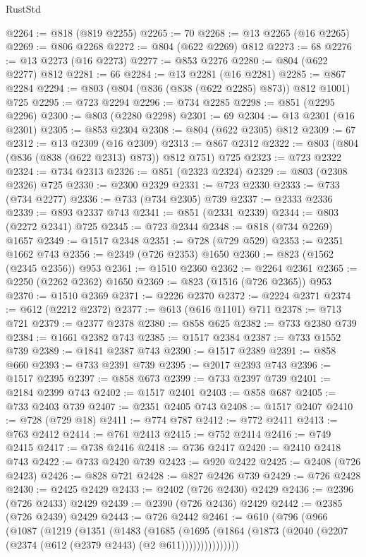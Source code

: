 \begin{lexlean}{RustStd}
\begin{coremodule}
@2264 := @818 (@819 @2255)
@2265 := 70
@2268 := @13 @2265 (@16 @2265)
@2269 := @806 @2268
@2272 := @804 (@622 @2269) @812
@2273 := 68
@2276 := @13 @2273 (@16 @2273)
@2277 := @853 @2276
@2280 := @804 (@622 @2277) @812
@2281 := 66
@2284 := @13 @2281 (@16 @2281)
@2285 := @867 @2284
@2294 := @803 (@804 (@836 (@838 (@622 @2285) @873)) @812 @1001) @725
@2295 := @723 @2294
@2296 := @734 @2285
@2298 := @851 (@2295 @2296)
@2300 := @803 (@2280 @2298)
@2301 := 69
@2304 := @13 @2301 (@16 @2301)
@2305 := @853 @2304
@2308 := @804 (@622 @2305) @812
@2309 := 67
@2312 := @13 @2309 (@16 @2309)
@2313 := @867 @2312
@2322 := @803 (@804 (@836 (@838 (@622 @2313) @873)) @812 @751) @725
@2323 := @723 @2322
@2324 := @734 @2313
@2326 := @851 (@2323 @2324)
@2329 := @803 (@2308 @2326) @725
@2330 := @2300 @2329
@2331 := @723 @2330
@2333 := @733 (@734 @2277)
@2336 := @733 (@734 @2305) @739
@2337 := @2333 @2336
@2339 := @893 @2337 @743
@2341 := @851 (@2331 @2339)
@2344 := @803 (@2272 @2341) @725
@2345 := @723 @2344
@2348 := @818 (@734 @2269) @1657
@2349 := @1517 @2348
@2351 := @728 (@729 @529)
@2353 := @2351 @1662 @743
@2356 := @2349 (@726 @2353) @1650
@2360 := @823 (@1562 (@2345 @2356)) @953
@2361 := @1510 @2360
@2362 := @2264 @2361
@2365 := @2250 (@2262 @2362) @1650
@2369 := @823 (@1516 (@726 @2365)) @953
@2370 := @1510 @2369
@2371 := @2226 @2370
@2372 := @2224 @2371
@2374 := @612 (@2212 @2372)
@2377 := @613 (@616 @1101) @711
@2378 := @713 @721
@2379 := @2377 @2378
@2380 := @858 @625
@2382 := @733 @2380 @739
@2384 := @1661 @2382 @743
@2385 := @1517 @2384
@2387 := @733 @1552 @739
@2389 := @1841 @2387 @743
@2390 := @1517 @2389
@2391 := @858 @660
@2393 := @733 @2391 @739
@2395 := @2017 @2393 @743
@2396 := @1517 @2395
@2397 := @858 @673
@2399 := @733 @2397 @739
@2401 := @2184 @2399 @743
@2402 := @1517 @2401
@2403 := @858 @687
@2405 := @733 @2403 @739
@2407 := @2351 @2405 @743
@2408 := @1517 @2407
@2410 := @728 (@729 @18)
@2411 := @774 @787
@2412 := @772 @2411
@2413 := @763 @2412
@2414 := @761 @2413
@2415 := @752 @2414
@2416 := @749 @2415
@2417 := @738 @2416
@2418 := @736 @2417
@2420 := @2410 @2418 @743
@2422 := @733 @2420 @739
@2423 := @920 @2422
@2425 := @2408 (@726 @2423)
@2426 := @828 @721
@2428 := @827 @2426 @739
@2429 := @726 @2428
@2430 := @2425 @2429
@2433 := @2402 (@726 @2430) @2429
@2436 := @2396 (@726 @2433) @2429
@2439 := @2390 (@726 @2436) @2429
@2442 := @2385 (@726 @2439) @2429
@2443 := @726 @2442
@2461 := @610
    (@796
      (@966
        (@1087
          (@1219
            (@1351
              (@1483
                (@1685
                  (@1695
                    (@1864 (@1873 (@2040 (@2207 (@2374 (@612 (@2379 @2443) (@2 @611)))))))))))))))

\end{coremodule}
\end{lexlean}
